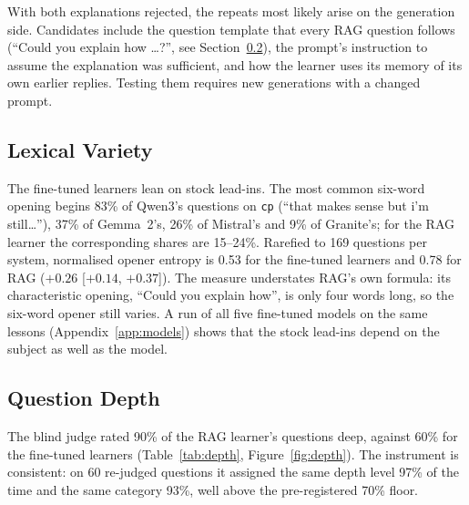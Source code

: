 \documentclass[pdflatex,sn-mathphys-num]{sn-jnl}%
\theoremstyle{thmstyleone}%
\theoremstyle{thmstyletwo}%
\theoremstyle{thmstylethree}%
\begin{document}
With both explanations rejected, the repeats most likely arise on the generation side. Candidates
include the question template that every RAG question follows (``Could you explain how \ldots?'', see
Section~\ref{sec:res-depth}), the prompt's instruction to assume the explanation was sufficient, and
how the learner uses its memory of its own earlier replies. Testing them requires new generations
with a changed prompt.

\subsection{Lexical Variety}\label{sec:res-lexical}

The fine-tuned learners lean on stock lead-ins. The most common six-word opening begins 83\% of
Qwen3's questions on \texttt{cp} (``that makes sense but i'm still\ldots''), 37\% of Gemma~2's,
26\% of Mistral's and 9\% of Granite's; for the RAG learner the corresponding shares are 15--24\%.
Rarefied to 169 questions per system, normalised opener entropy is 0.53 for the fine-tuned learners
and 0.78 for RAG ($+0.26$ [$+0.14$, $+0.37$]). The measure understates RAG's own formula: its
characteristic opening, ``Could you explain how'', is only four words long, so the six-word opener
still varies. A run of all five fine-tuned models on the same lessons (Appendix~\ref{app:models})
shows that the stock lead-ins depend on the subject as well as the model.

\subsection{Question Depth}\label{sec:res-depth}

The blind judge rated 90\% of the RAG learner's questions deep, against 60\% for the fine-tuned
learners (Table~\ref{tab:depth}, Figure~\ref{fig:depth}). The instrument is consistent: on 60
re-judged questions it assigned the same depth level 97\% of the time and the same category 93\%,
well above the pre-registered 70\% floor.
\end{document}
